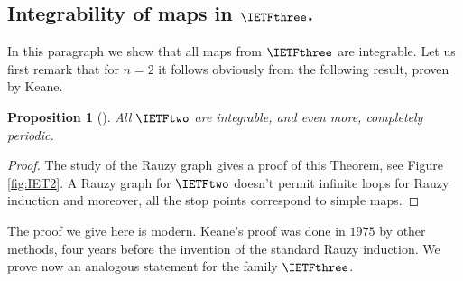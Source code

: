 \documentclass[12pt]{article}
\newtheorem{proposition}{Proposition}
\theoremstyle{definition}
\begin{document}
\subsection{Integrability of maps in $\IETFthree$.}

In this paragraph we show that all maps from $\IETFthree$ are integrable. Let us first remark that for $n=2$ it follows obviously from the following result, proven by Keane.

\begin{proposition}[\cite{K75}]\label{prop:keane}
All $\IETFtwo$ are integrable, and even more, completely periodic. 
\end{proposition}

\begin{proof} 
The study of the Rauzy graph gives a proof of this Theorem, see Figure \ref{fig:IET2}. A Rauzy graph for $\IETFtwo$ doesn't permit infinite loops for Rauzy induction and moreover, all the stop points correspond to simple maps.
\end{proof}

The proof we give here is modern. Keane's proof was done in $1975$ by other methods, four years before the invention of the standard Rauzy induction. We prove now an analogous statement for the family $\IETFthree$. 
\end{document}
